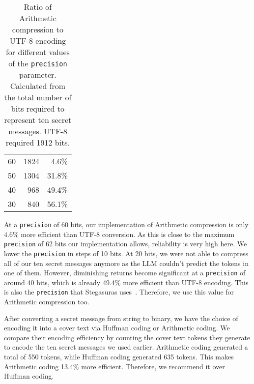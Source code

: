 \begin{table}
	\centering
	\begin{tabular}{@{} p{2.5cm} rr @{}} %
		\toprule
		\tableheadline{Precision} & \tableheadline{Bits} & \tableheadline{Ratio} \\
        \midrule
        60                        &                 1824 &                 4.6\% \\
		50                        &                 1304 &                31.8\% \\
        40                        &                  968 &                49.4\% \\
        30                        &                  840 &                56.1\% \\
		\bottomrule
	\end{tabular}
	\caption[Compression measurements]{Ratio of Arithmetic compression to UTF-8 encoding for different values of the \lstinline|precision| parameter. Calculated from the total number of bits required to represent ten secret messages. UTF-8 required 1912 bits.}
	\label{tab:compression}
\end{table}

At a \lstinline|precision| of 60 bits, our implementation of Arithmetic compression is only 4.6\% more efficient than UTF-8 conversion. As this is close to the maximum \lstinline|precision| of 62 bits our implementation allows, reliability is very high here. We lower the \lstinline|precision| in steps of 10 bits. At 20 bits, we were not able to compress all of our ten secret messages anymore as the \gls{LLM} couldn't predict the tokens in one of them. However, diminishing returns become significant at a \lstinline|precision| of around 40 bits, which is already 49.4\% more efficient than UTF-8 encoding. This is also the \lstinline|precision| that Stegasuras uses~\cite{zieglerHarvardnlpNeuralSteganography2025}. Therefore, we use this value for Arithmetic compression too.

After converting a secret message from string to binary, we have the choice of encoding it into a cover text via Huffman coding or Arithmetic coding. We compare their encoding efficiency by counting the cover text tokens they generate to encode the ten secret messages we used earlier. Arithmetic coding generated a total of 550 tokens, while Huffman coding generated 635 tokens. This makes Arithmetic coding 13.4\% more efficient. Therefore, we recommend it over Huffman coding.

